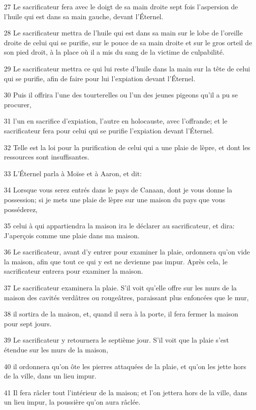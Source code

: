 \par 27 Le sacrificateur fera avec le doigt de sa main droite sept fois l'aspersion de l'huile qui est dans sa main gauche, devant l'Éternel.
\par 28 Le sacrificateur mettra de l'huile qui est dans sa main sur le lobe de l'oreille droite de celui qui se purifie, sur le pouce de sa main droite et sur le gros orteil de son pied droit, à la place où il a mis du sang de la victime de culpabilité.
\par 29 Le sacrificateur mettra ce qui lui reste d'huile dans la main sur la tête de celui qui se purifie, afin de faire pour lui l'expiation devant l'Éternel.
\par 30 Puis il offrira l'une des tourterelles ou l'un des jeunes pigeons qu'il a pu se procurer,
\par 31 l'un en sacrifice d'expiation, l'autre en holocauste, avec l'offrande; et le sacrificateur fera pour celui qui se purifie l'expiation devant l'Éternel.
\par 32 Telle est la loi pour la purification de celui qui a une plaie de lèpre, et dont les ressources sont insuffisantes.
\par 33 L'Éternel parla à Moïse et à Aaron, et dit:
\par 34 Lorsque vous serez entrés dans le pays de Canaan, dont je vous donne la possession; si je mets une plaie de lèpre sur une maison du pays que vous posséderez,
\par 35 celui à qui appartiendra la maison ira le déclarer au sacrificateur, et dira: J'aperçois comme une plaie dans ma maison.
\par 36 Le sacrificateur, avant d'y entrer pour examiner la plaie, ordonnera qu'on vide la maison, afin que tout ce qui y est ne devienne pas impur. Après cela, le sacrificateur entrera pour examiner la maison.
\par 37 Le sacrificateur examinera la plaie. S'il voit qu'elle offre sur les murs de la maison des cavités verdâtres ou rougeâtres, paraissant plus enfoncées que le mur,
\par 38 il sortira de la maison, et, quand il sera à la porte, il fera fermer la maison pour sept jours.
\par 39 Le sacrificateur y retournera le septième jour. S'il voit que la plaie s'est étendue sur les murs de la maison,
\par 40 il ordonnera qu'on ôte les pierres attaquées de la plaie, et qu'on les jette hors de la ville, dans un lieu impur.
\par 41 Il fera râcler tout l'intérieur de la maison; et l'on jettera hors de la ville, dans un lieu impur, la poussière qu'on aura râclée.
